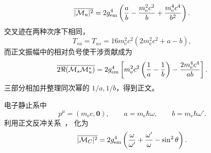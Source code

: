 \begin{derivation}
\begin{equation*}
 \overline{|\mathcal M_u|^2}
 =2g_{\rm em}^4\left(\frac ab-\frac{m_{\mathrm e}^2c^2}{b}+\frac{m_{\mathrm e}^4c^4}{b^2}\right).
\end{equation*}
交叉迹在两种次序下相同，
\begin{equation*}
 T_{su}=T_{us}=16m_{\mathrm e}^2c^2(2m_{\mathrm e}^2c^2+a-b),
\end{equation*}
而正文振幅中的相对负号使干涉贡献成为
\begin{equation*}
 \overline{2\Re(\mathcal M_s\mathcal M_u^*)}
 =2g_{\rm em}^4\left[
 m_{\mathrm e}^2c^2\left(\frac1a-\frac1b\right)
 -\frac{2m_{\mathrm e}^4c^4}{ab}\right].
\end{equation*}
三部分相加并整理同次幂的 $1/a,1/b$，得到正文。

电子静止系中
\begin{equation*}
 p^\mu=(m_{\mathrm e} c,\mathbf0),\qquad
 a=m_{\mathrm e}\hbar\omega,\qquad b=m_{\mathrm e}\hbar\omega'.
\end{equation*}
利用正文反冲关系~， 化为
\begin{equation*}
 \overline{|\mathcal M_C|^2}
 =2g_{\rm em}^4\left(
 \frac\omega{\omega'}+\frac{\omega'}\omega-\sin^2\theta\right).
\end{equation*}


\end{derivation}
